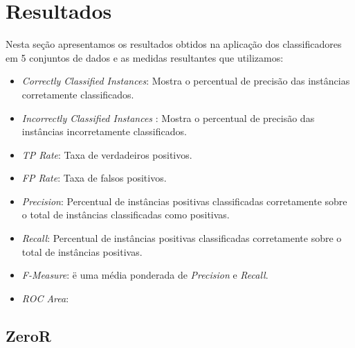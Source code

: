 \documentclass[
	12pt,				%
	openright,			%
	oneside,	
	a4paper,				%
	english,				%
	brazil				%
]{abntex2/abntex2} %
\begin{document}
	\section{Resultados}
	
	Nesta seção apresentamos os resultados obtidos na aplicação dos classificadores em  5  conjuntos de dados e as medidas resultantes que utilizamos:
	\begin{itemize}
		\item \textit{Correctly Classified Instances}: Mostra o percentual de precisão das instâncias corretamente classificados.
		\item \textit{Incorrectly Classified Instances} : Mostra o percentual de precisão das instâncias incorretamente classificados.
		\item \textit{TP Rate}: Taxa de verdadeiros positivos.
		\item \textit{FP Rate}: Taxa de falsos positivos.
		\item \textit{Precision}: Percentual de instâncias positivas classificadas corretamente sobre o total de instâncias classificadas como positivas.
		\item \textit{Recall}: Percentual de instâncias positivas classificadas corretamente sobre o total de instâncias positivas.
		\item \textit{F-Measure}: ë uma média ponderada de \textit{Precision} e \textit{Recall}.
		\item \textit{ROC Area}: 
	\end{itemize}
	
		\subsection{ZeroR}
		
\end{document}
